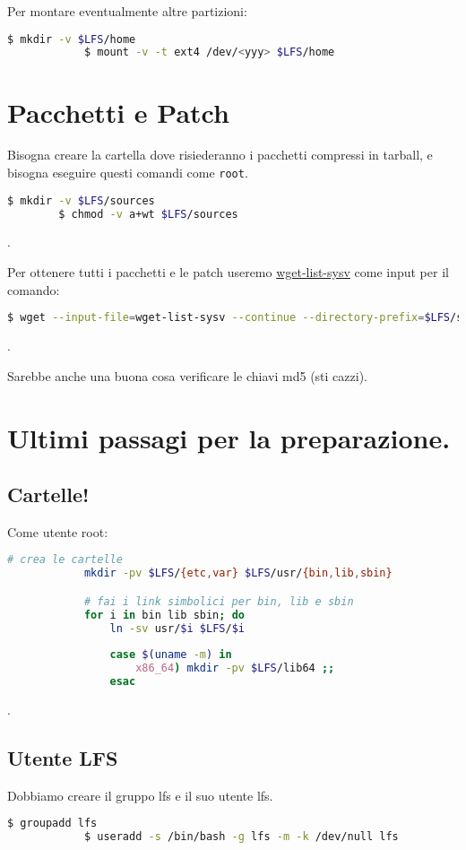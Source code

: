 \documentclass{article}
\begin{document}
        Per montare eventualmente altre partizioni:
        \begin{lstlisting}[language=bash]
            $ mkdir -v $LFS/home
            $ mount -v -t ext4 /dev/<yyy> $LFS/home
        \end{lstlisting}
    
\section{Pacchetti e Patch}
    Bisogna creare la cartella dove risiederanno i pacchetti compressi in tarball, e bisogna eseguire 
    questi comandi come \texttt{root}.
    \begin{lstlisting}[language=bash]
        $ mkdir -v $LFS/sources
        $ chmod -v a+wt $LFS/sources
    \end{lstlisting}.

    Per ottenere tutti i pacchetti e le patch useremo \href{https://www.linuxfromscratch.org/lfs/downloads/wget-list-sysv}{wget-list-sysv}
    come input per il comando:
    \begin{lstlisting}[language=bash]
        $ wget --input-file=wget-list-sysv --continue --directory-prefix=$LFS/sources
    \end{lstlisting}.

    Sarebbe anche una buona cosa verificare le chiavi md5 (sti cazzi).


\section{Ultimi passagi per la preparazione.}
    \subsection{Cartelle!}
        Come utente root:
        \begin{lstlisting}[language=bash]
            # crea le cartelle
            mkdir -pv $LFS/{etc,var} $LFS/usr/{bin,lib,sbin}

            # fai i link simbolici per bin, lib e sbin
            for i in bin lib sbin; do
                ln -sv usr/$i $LFS/$i
            
                case $(uname -m) in
                    x86_64) mkdir -pv $LFS/lib64 ;;
                esac
        \end{lstlisting}.
    \subsection{Utente LFS}
        Dobbiamo creare il gruppo lfs e il suo utente lfs.
        \begin{lstlisting}[language=bash]
            $ groupadd lfs
            $ useradd -s /bin/bash -g lfs -m -k /dev/null lfs
        \end{lstlisting}
\end{document}
